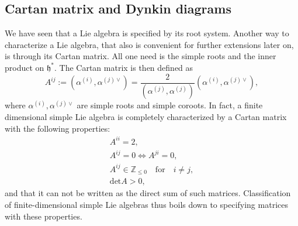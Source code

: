

\subsection{Cartan matrix and Dynkin diagrams}
We have seen that a Lie algebra is specified by its root system. Another way to characterize a Lie algebra, that also is convenient for further extensions later on, is through its Cartan matrix. All one need is the simple roots and the inner product on $\mathfrak{h}^*$. The Cartan matrix is then defined as 
\begin{equation}
    A^{ij} := (\alpha^{(i)},\alpha^{(j)\vee})  = \frac{2}{(\alpha^{(j)},\alpha^{(j)})}(\alpha^{(i)},\alpha^{(j)\vee}),
\end{equation}
where $\alpha^{(i)},\alpha^{(j)\vee}$ are simple roots and simple coroots. In fact, a finite dimensional simple Lie algebra is completely characterized by a Cartan matrix with the following properties:
\begin{equation}
    \begin{aligned}
        A^{ii} = 2,\\
        A^{ij} = 0 \Longleftrightarrow A^{ji} = 0,\\
        A^{ij}\in \mathbb{Z}_{\leq 0} \quad\text{for}\quad i\neq j,\\
        \text{det}A >0,
    \end{aligned}
\end{equation}
and that it can not be written as the direct sum of such matrices. Classification of finite-dimensional simple Lie algebras thus boils down to specifying matrices with these properties. 


